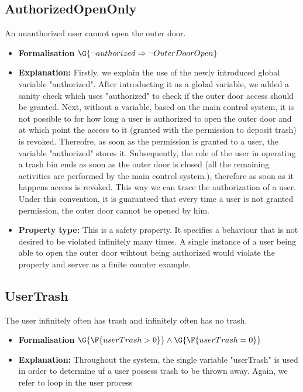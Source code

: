 \subsection{AuthorizedOpenOnly}
An unauthorized user cannot open the outer door.
\begin{itemize}
	\item \textbf{Formalisation} $\G{\neg authorized \Rightarrow \neg OuterDoorOpen}$
	\item \textbf{Explanation:} Firstly, we explain the use of the newly introduced global variable "authorized". After introducting it as a global variable, we added a sanity check which uses "authorized" to check if the outer door access should be granted. Next, without a variable, based on the main control system, it is not possible to for how long a user is authorized to open the outer door and at which point the access to it (granted with the permission to deposit trash) is revoked. Thereofre, as soon as the permission is granted to a user, the variable "authorized" stores it. Subsequently, the role of the user in operating a trash bin ends as soon as the outer door is closed (all the remaining activities are performed by the main control system.), therefore as soon as it happens access is revoked. This way we can trace the authorization of a user. Under this convention, it is guaranteed that every time a user is not granted permission, the outer door cannot be opened by him.
	\item \textbf{Property type:} This is a safety property. It specifies a behaviour that is not desired to be violated infinitely many times. A single instance of a user being able to open the outer door wihtout being authorized would violate the property and server as a finite counter example.
\end{itemize}
\subsection{UserTrash}
The user infinitely often has trash and infinitely often has no trash.
\begin{itemize}
	\item \textbf{Formalisation} $\G{\F{userTrash > 0}} \wedge \G{\F{userTrash = 0}}$
	\item \textbf{Explanation:} Throughout the system, the single variable "userTrash" is used in order to determine uf a user possess trash to be thrown away. Again, we refer to loop in the user process
\end{itemize}

